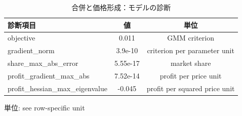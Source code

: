 \begingroup
\begin{table}[htbp]
\centering
\caption{合併と価格形成：モデルの診断}
\label{tab:specialist-blp-supply-r01-displays-model_fit}
\begin{tabular}{lcc}
\toprule
診断項目 & 値 & 単位 \\
\midrule
objective & 0.011 & GMM criterion \\
gradient\_norm & 3.9e-10 & criterion per parameter unit \\
share\_max\_abs\_error & 5.55e-17 & market share \\
profit\_gradient\_max\_abs & 7.52e-14 & profit per price unit \\
profit\_hessian\_max\_eigenvalue & -0.045 & profit per squared price unit \\
\bottomrule
\end{tabular}
\par\medskip\begin{minipage}{\linewidth}\footnotesize
単位: see row-specific unit
\end{minipage}
\end{table}
\endgroup
